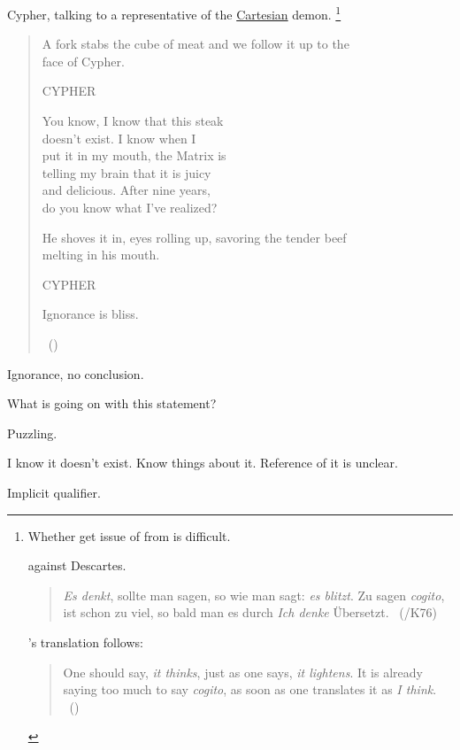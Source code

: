 \begin{note}
  Cypher, talking to a representative of the \hyperlink{cite.Descartes:1996vp}{Cartesian} demon.%
  \footnote{
    Whether get issue of  from \citeauthor{Descartes:1996vp} is difficult.

    \citeauthor{Lichtenberg:1991tf} against Descartes.

    \begin{quote}
      \emph{Es denkt}, sollte man sagen, so wie man sagt: \emph{es blitzt}.
      Zu sagen \emph{cogito}, ist schon zu viel, so bald man es durch \emph{Ich denke} \"{U}bersetzt.
      \mbox{ }\hfill\mbox{(\citeyear[412]{Lichtenberg:1991tf}/K76)}
    \end{quote}

    \citeauthor{Zoller:1992ud}'s translation follows:
    \begin{quote}
      One should say, \emph{it thinks}, just as one says, \emph{it lightens}.
      It is already saying too much to say \emph{cogito}, as soon as one translates it as \emph{I think}.
      \mbox{ }\hfill\mbox{(\citeyear[418]{Zoller:1992ud})}
    \end{quote}
  }
  \begin{quote}
    {
    \ttfamily

    A fork stabs the cube of meat and we follow it up to the  \\
    face of Cypher.

    \qquad\qquad CYPHER

    \qquad You know, I know that this steak \\
    \indent\qquad doesn't exist. I know when I \\
    \indent\qquad put it in my mouth, the Matrix is \\
    \indent\qquad telling my brain that it is juicy \\
    \indent\qquad and delicious. After nine years, \\
    \indent\qquad do you know what I've realized?

    He shoves it in, eyes rolling up, savoring the tender beef \\
    melting in his mouth.

    \qquad\qquad CYPHER

    \qquad Ignorance is bliss.}%
    \mbox{ }\hfill\mbox{(\citeyear[330--331]{Wachowski:2000uh})}
  \end{quote}

  Ignorance, no conclusion.

  What is going on with this statement?

  Puzzling.

  I know it doesn't exist.
  Know things about it.
  Reference of it is unclear.

  Implicit qualifier.
\end{note}

